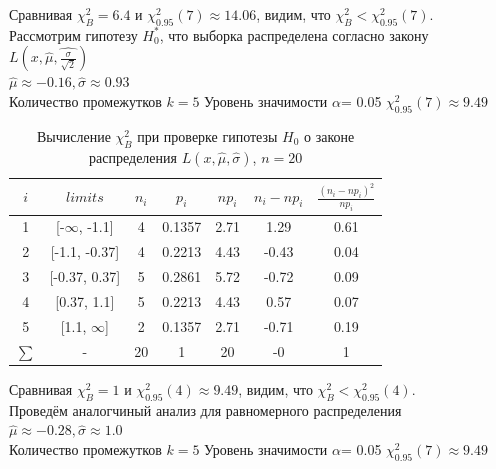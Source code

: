 \documentclass[a4paper,14pt]{article}
\begin{document}
	\noindent Сравнивая $\chi^{2}_{B} = 6.4$ и $\chi^{2}_{0.95}(7) \approx 14.06$, видим, что $\chi^{2}_{B} < \chi^{2}_{0.95}(7)$.
	\\
	Рассмотрим гипотезу $H^*_0$, что выборка распределена согласно закону $L(x,\hat{\mu}, \hat{\frac{\sigma}{\sqrt{2}}})$\\
	$\hat{\mu} \approx -0.16, \hat{\sigma} \approx 0.93$\\
	Количество промежутков $k = 5$
	\newline
	Уровень значимости $\alpha$= 0.05
	\newline
	$\chi^{2}_{0.95}(7) \approx 9.49$\\
	\begin{table}[H]
		\centering
		\begin{tabular}{| c | c | c | c | c | c | c |}
			\hline
			$i$ & $limits$         &   $n_i$ &    $p_i$ &   $np_i$ &   $n_i - np_i$ &   $\frac{(n_i-np_i)^2}{np_i}$ \\
			\hline
			1 & [-$\infty$, -1.1] &     4 & 0.1357 &   2.71 &        1.29 &                        0.61 \\
			2 & [-1.1, -0.37]  &     4 & 0.2213 &   4.43 &        -0.43 &                        0.04 \\
			3 & [-0.37, 0.37]  &    5 & 0.2861 &   5.72 &         -0.72 &                        0.09 \\
			4 & [0.37, 1.1]    &     5 & 0.2213 &   4.43 &        0.57 &                        0.07 \\
			5 & [1.1, $\infty$]   &     2 & 0.1357 &   2.71 &        -0.71 &                        0.19 \\
			$\sum$ & -              &    20 & 1      &  20    &        -0    &                        1 \\
			\hline
		\end{tabular}
		\caption{ Вычисление $\chi^{2}_{B}$ при проверке гипотезы $H_{0}$ о законе распределения $L(x,\hat{\mu}, \hat{\sigma})$, $n=20$}
		\label{tab:laplace_chi_2}
	\end{table}
	
	\noindent Сравнивая $\chi^{2}_{B} = 1$ и $\chi^{2}_{0.95}(4) \approx 9.49$, видим, что $\chi^{2}_{B} < \chi^{2}_{0.95}(4)$.
	\\
	Проведём аналогчиный анализ для равномерного распределения\\
	$\hat{\mu} \approx -0.28, \hat{\sigma} \approx 1.0$\\
	Количество промежутков $k = 5$
	\newline
	Уровень значимости $\alpha$= 0.05
	\newline $\chi^{2}_{0.95}(7) \approx 9.49$\\
	
\end{document}
